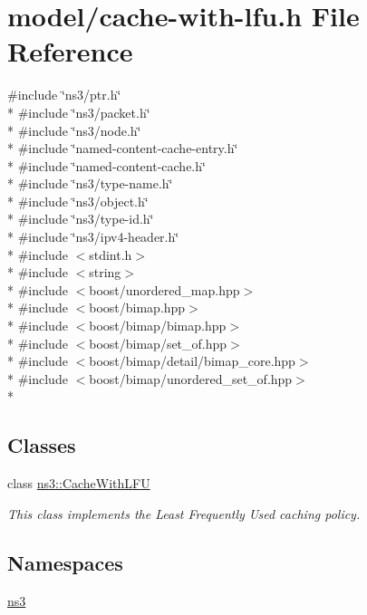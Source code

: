 \hypertarget{cache-with-lfu_8h}{\section{model/cache-\/with-\/lfu.h File Reference}
\label{cache-with-lfu_8h}
}
{\ttfamily \#include \char`\"{}ns3/ptr.\-h\char`\"{}}\\*
{\ttfamily \#include \char`\"{}ns3/packet.\-h\char`\"{}}\\*
{\ttfamily \#include \char`\"{}ns3/node.\-h\char`\"{}}\\*
{\ttfamily \#include \char`\"{}named-\/content-\/cache-\/entry.\-h\char`\"{}}\\*
{\ttfamily \#include \char`\"{}named-\/content-\/cache.\-h\char`\"{}}\\*
{\ttfamily \#include \char`\"{}ns3/type-\/name.\-h\char`\"{}}\\*
{\ttfamily \#include \char`\"{}ns3/object.\-h\char`\"{}}\\*
{\ttfamily \#include \char`\"{}ns3/type-\/id.\-h\char`\"{}}\\*
{\ttfamily \#include \char`\"{}ns3/ipv4-\/header.\-h\char`\"{}}\\*
{\ttfamily \#include $<$stdint.\-h$>$}\\*
{\ttfamily \#include $<$string$>$}\\*
{\ttfamily \#include $<$boost/unordered\-\_\-map.\-hpp$>$}\\*
{\ttfamily \#include $<$boost/bimap.\-hpp$>$}\\*
{\ttfamily \#include $<$boost/bimap/bimap.\-hpp$>$}\\*
{\ttfamily \#include $<$boost/bimap/set\-\_\-of.\-hpp$>$}\\*
{\ttfamily \#include $<$boost/bimap/detail/bimap\-\_\-core.\-hpp$>$}\\*
{\ttfamily \#include $<$boost/bimap/unordered\-\_\-set\-\_\-of.\-hpp$>$}\\*
\subsection*{Classes}
\begin{DoxyCompactItemize}
\item 
class \hyperlink{classns3_1_1CacheWithLFU}{ns3\-::\-Cache\-With\-L\-F\-U}
\begin{DoxyCompactList}\small\item\em This class implements the Least Frequently Used caching policy. \end{DoxyCompactList}\end{DoxyCompactItemize}
\subsection*{Namespaces}
\begin{DoxyCompactItemize}
\item 
\hyperlink{namespacens3}{ns3}
\end{DoxyCompactItemize}
